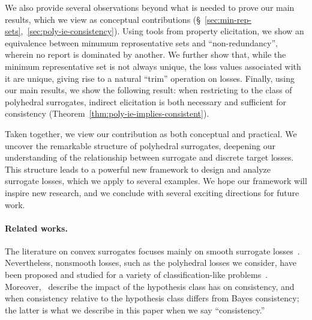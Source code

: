 \documentclass[11pt]{article}
\newcommand{\Comments}{1}
\newcommand{\mynote}[2]{\ifnum\Comments=1\textcolor{#1}{#2}\fi}
\newcommand{\jessie}[1]{\mynote{teal}{[JF: #1]}}
\begin{document}
We also provide several observations beyond what is needed to prove our main results, which we view as conceptual contributions (\S~\ref{sec:min-rep-sets},~\ref{sec:poly-ie-consistency}).
Using tools from property elicitation, we show an equivalence between minumum reprosentative sets and ``non-redundancy'', wherein no report is dominated by another.
We further show that, while the minimum representative set is not always unique, the loss values associated with it are unique, giving rise to a natural ``trim'' operation on losses.
Finally, using our main results, we show the following result: when restricting to the class of polyhedral surrogates, indirect elicitation is both necessary and sufficient for consistency (Theorem~\ref{thm:poly-ie-implies-consistent}).

Taken together, we view our contribution as both conceptual and practical.
We uncover the remarkable structure of polyhedral surrogates, deepening our understanding of the relationship between surrogate and discrete target losses.
This structure leads to a powerful new framework to design and analyze surrogate losses, which we apply to several examples.
We hope our framework will inspire new research, and we conclude with several exciting directions for future work.


\paragraph{Related works.}
The literature on convex surrogates focuses mainly on smooth surrogate losses~\citep{crammer2001algorithmic,bartlett2006convexity,bartlett2008classification, duchi2018multiclass, williamson2016composite, reid2010composite,menon2019multilabel,zhang2020convex,bao2020calibrated}.
Nevertheless, nonsmooth losses, such as the polyhedral losses we consider, have been proposed and studied for a variety of classification-like problems~\citep{yang2018consistency,yu2018lovasz,lapin2015top}.
Moreover,~\citet{zhang2020bayes} describe the impact of the hypothesis class has on consistency, and when consistency relative to the hypothesis class differs from Bayes consistency; the latter is what we describe in this paper when we say ``consistency.''
\end{document}
